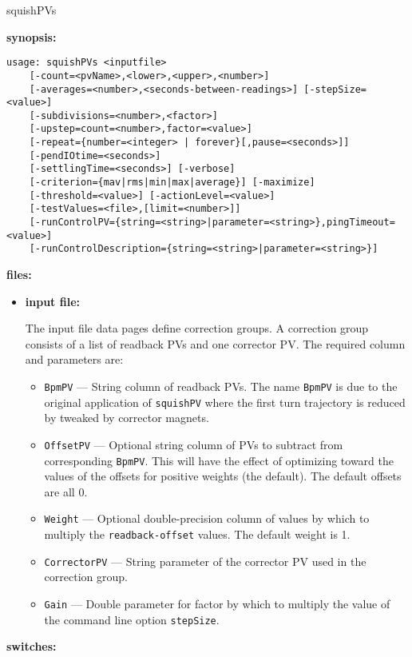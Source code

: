 \begin{sddsprog}{squishPVs}
\item {\bf synopsis:} 
\begin{verbatim}
usage: squishPVs <inputfile>
    [-count=<pvName>,<lower>,<upper>,<number>]
    [-averages=<number>,<seconds-between-readings>] [-stepSize=<value>]
    [-subdivisions=<number>,<factor>]
    [-upstep=count=<number>,factor=<value>]
    [-repeat={number=<integer> | forever}[,pause=<seconds>]]
    [-pendIOtime=<seconds>]
    [-settlingTime=<seconds>] [-verbose]
    [-criterion={mav|rms|min|max|average}] [-maximize]
    [-threshold=<value>] [-actionLevel=<value>]
    [-testValues=<file>,[limit=<number>]]
    [-runControlPV={string=<string>|parameter=<string>},pingTimeout=<value>]
    [-runControlDescription={string=<string>|parameter=<string>}]
\end{verbatim}

\item {\bf files:}
\begin{itemize}
\item {\bf input file:}\par
The input file data pages define correction groups. A correction group
consists of a list of readback PVs and one corrector PV. The required column and parameters are:
\begin{itemize}
        \item {\tt BpmPV} --- String column of readback PVs. The name \verb+BpmPV+ is due
                to the original application of \verb+squishPV+ where the first turn
                trajectory is reduced by tweaked by corrector magnets.
        \item {\tt OffsetPV} --- Optional string column of PVs to subtract from corresponding \verb+BpmPV+.
                This will have the effect of optimizing toward the values of the offsets for
                positive weights (the default).  The default offsets are all 0.
        \item {\tt Weight} --- Optional double-precision column of values by which to multiply the
                \verb+readback-offset+ values.  The default weight is 1.
        \item {\tt CorrectorPV} --- String parameter of the corrector PV used in the correction group.
        \item {\tt Gain} --- Double parameter for factor by which to multiply the
                value of the command line option \verb+stepSize+.
\end{itemize}
\end{itemize}
\item {\bf switches:}

\end{sddsprog}
